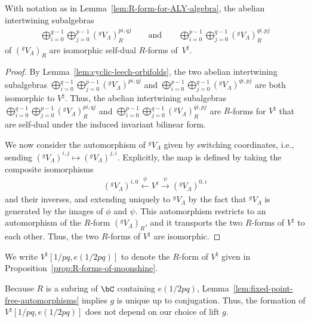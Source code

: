 \begin{prop} \label{prop:R-forms-of-moonshine}
With notation as in Lemma~{\rm \ref{lem:R-form-for-ALY-algebra}}, the abelian intertwining subalgebras
\begin{gather*} \bigoplus_{i=0}^{q-1} \bigoplus_{j=0}^{p-1} ({}^gV_\Lambda)_R^{pi,qj} \qquad \text{and} \qquad \bigoplus_{i=0}^{p-1} \bigoplus_{j=0}^{q-1} ({}^gV_\Lambda)_R^{qi,pj}\end{gather*} of $({}^gV_\Lambda)_R$ are isomorphic self-dual $R$-forms of~$V^\natural$.
\end{prop}
\begin{proof}By Lemma~\ref{lem:cyclic-leech-orbifolds}, the two abelian intertwining subalgebras $\bigoplus_{i=0}^{q-1} \bigoplus_{j=0}^{p-1} ({}^gV_\Lambda)^{pi,qj}$ and $\bigoplus_{i=0}^{p-1} \bigoplus_{j=0}^{q-1} ({}^gV_\Lambda)^{qi,pj}$ are both isomorphic to $V^\natural$. Thus, the abelian intertwining subalgebras $\bigoplus_{i=0}^{q-1} \bigoplus_{j=0}^{p-1} ({}^gV_\Lambda)_R^{pi,qj}$ and $\bigoplus_{i=0}^{p-1} \bigoplus_{j=0}^{q-1} ({}^gV_\Lambda)_R^{qi,pj}$ are $R$-forms for $V^\natural$ that are self-dual under the induced invariant bilinear form.

We now consider the automorphism of ${}^gV_\Lambda$ given by switching coordinates, i.e., sending $({}^gV_\Lambda)^{i,j} \mapsto ({}^gV_\Lambda)^{j,i}$. Explicitly, the map is defined by taking the composite isomorphisms
\begin{gather*} ({}^gV_\Lambda)^{i,0} \overset{\phi}{\leftarrow} V^i \overset{\psi}{\to} ({}^gV_\Lambda)^{0,i} \end{gather*}
and their inverses, and extending uniquely to ${}^gV_\Lambda$ by the fact that ${}^gV_\Lambda$ is generated by the images of $\phi$ and $\psi$. This automorphism restricts to an automorphism of the $R$-form $({}^gV_\Lambda)_R$, and it transports the two $R$-forms of $V^\natural$ to each other. Thus, the two $R$-forms of $V^\natural$ are isomorphic.
\end{proof}

\begin{defn}We write $V^\natural[1/pq,e(1/2pq)]$ to denote the $R$-form of $V^\natural$ given in Proposi\-tion~\ref{prop:R-forms-of-moonshine}.
\end{defn}

\begin{rem}Because $R$ is a subring of $\bC$ containing $e(1/2pq)$, Lemma~\ref{lem:fixed-point-free-automorphisms} implies $g$ is unique up to conjugation. Thus, the formation of $V^\natural[1/pq,e(1/2pq)]$ does not depend on our choice of lift $g$.
\end{rem}

